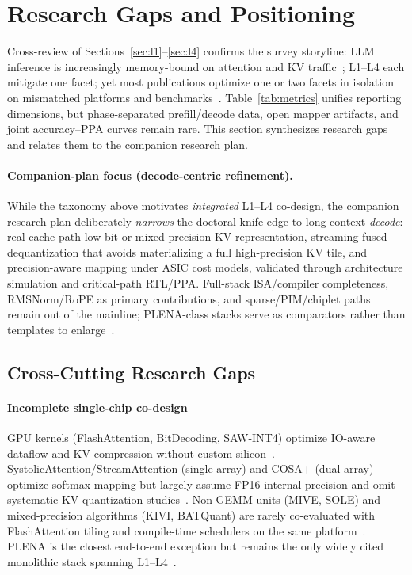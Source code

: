 \documentclass[conference]{IEEEtran}
\begin{document}
\section{Research Gaps and Positioning}
\label{sec:gaps}

Cross-review of Sections~\ref{sec:l1}--\ref{sec:l4} confirms the survey storyline: LLM inference is increasingly memory-bound on attention and KV traffic~\cite{dao2023flashdecoding,bitdecoding2026,sawint42026}; L1--L4 each mitigate one facet; yet most publications optimize one or two facets in isolation on mismatched platforms and benchmarks~\cite{lin2025systolicattention,liu2024kivi,mive2026,plena2025,sawint42026}.
Table~\ref{tab:metrics} unifies reporting dimensions, but phase-separated prefill/decode data, open mapper artifacts, and joint accuracy--PPA curves remain rare.
This section synthesizes research gaps and relates them to the companion research plan.

\paragraph{Companion-plan focus (decode-centric refinement).}
While the taxonomy above motivates \emph{integrated} L1--L4 co-design, the companion research plan deliberately \emph{narrows} the doctoral knife-edge to long-context \emph{decode}: real cache-path low-bit or mixed-precision KV representation, streaming fused dequantization that avoids materializing a full high-precision KV tile, and precision-aware mapping under ASIC cost models, validated through architecture simulation and critical-path RTL/PPA.
Full-stack ISA/compiler completeness, RMSNorm/RoPE as primary contributions, and sparse/PIM/chiplet paths remain out of the mainline; PLENA-class stacks serve as comparators rather than templates to enlarge~\cite{plena2025,bitdecoding2026,sawint42026}.

\subsection{Cross-Cutting Research Gaps}
\label{sec:gaps-synthesis}

\paragraph{Incomplete single-chip co-design}
GPU kernels (FlashAttention, BitDecoding, SAW-INT4) optimize IO-aware dataflow and KV compression without custom silicon~\cite{dao2022flashattention,bitdecoding2026,sawint42026}.
SystolicAttention/StreamAttention (single-array) and COSA+ (dual-array) optimize softmax mapping but largely assume FP16 internal precision and omit systematic KV quantization studies~\cite{lin2025systolicattention,streamattention2025,wang2023cosa}.
Non-GEMM units (MIVE, SOLE) and mixed-precision algorithms (KIVI, BATQuant) are rarely co-evaluated with FlashAttention tiling and compile-time schedulers on the same platform~\cite{mive2026,sole2025,liu2024kivi,batquant2026,plena2025}.
PLENA is the closest end-to-end exception but remains the only widely cited monolithic stack spanning L1--L4~\cite{plena2025}.
\end{document}
